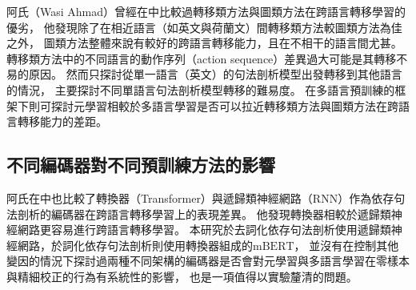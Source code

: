阿氏（Wasi Ahmad）曾經在\cite{ahmad-etal-2019-difficulties}中比較過轉移類方法與圖類方法在跨語言轉移學習的優劣，
他發現除了在相近語言（如英文與荷蘭文）間轉移類方法較圖類方法為佳之外，
圖類方法整體來說有較好的跨語言轉移能力，且在不相干的語言間尤甚。
轉移類方法中的不同語言的動作序列（action sequence）差異過大可能是其轉移不易的原因。
然而\cite{ahmad-etal-2019-difficulties}只探討從單一語言（英文）的句法剖析模型出發轉移到其他語言的情況，
主要探討不同單語言句法剖析模型轉移的難易度。
在多語言預訓練的框架下則可探討元學習相較於多語言學習是否可以拉近轉移類方法與圖類方法在跨語言轉移能力的差距。

\subsection{不同編碼器對不同預訓練方法的影響}
阿氏在\cite{ahmad-etal-2019-difficulties}中也比較了轉換器（Transformer）與遞歸類神經網路（RNN）作為依存句法剖析的編碼器在跨語言轉移學習上的表現差異。
他發現轉換器相較於遞歸類神經網路更容易進行跨語言轉移學習。
本研究於去詞化依存句法剖析使用遞歸類神經網路，於詞化依存句法剖析則使用轉換器組成的$\mathrm{mBERT}$，
並沒有在控制其他變因的情況下探討過兩種不同架構的編碼器是否會對元學習與多語言學習在零樣本與精細校正的行為有系統性的影響，
也是一項值得以實驗釐清的問題。
